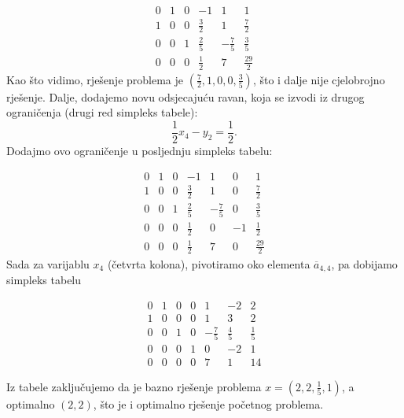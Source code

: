 \documentclass[a4paper, utf8, 11pt, colorlinks]{book}
\begin{document}
$$
\begin{array}{ccccc|c}
    0    &  1  &   0 &   -1  &            1 & 1                  \\
    1    &  0  &  0 &    \frac{3}{2}  &  1 & \frac{7}{2}\\ 
    0    &  0  &  1  &   \frac{2}{5}    &  -\frac{7}{5} & \frac{3}{5}  \\
     \hline 
    0    &  0  &  0   &    \frac{1}{2}  &  7  &    \frac{29}{2}
\end{array}
$$
Kao što vidimo, rješenje problema je $(\frac{7}{2}, 1, 0, 0, \frac{3}{5})$, što i dalje nije cjelobrojno rješenje. Dalje, dodajemo novu odsjecajuću ravan, koja se izvodi iz drugog ograničenja (drugi red simpleks tabele): 
$$ \frac{1}{2} x_4 - y_2 = \frac{1}{2}.$$
Dodajmo ovo ograničenje u posljednju simpleks tabelu:

$$
\begin{array}{cccccc|c}
    0    &  1  &   0 &   -1  &            1 & 0 & 1                  \\
    1    &  0  &  0 &    \frac{3}{2}    &  1 & 0 &  \frac{7}{2}\\ 
    0    &  0  &  1  &   \frac{2}{5}    &  -\frac{7}{5} &  0 & \frac{3}{5}  \\
    0    & 0   &  0  &   \frac{1}{2}    & 0     & -1 & \frac{1}{2} \\
     \hline 
    0    &  0  &  0   &    \frac{1}{2}  &  7  &   0 &  \frac{29}{2}
\end{array}
$$
Sada za varijablu $x_4$ (četvrta kolona), pivotiramo oko elementa $\overline{a}_{4,4}$, pa dobijamo simpleks tabelu 

$$
\begin{array}{cccccc|c}
0 &  1   &  0  &  0  &    1             &    -2           &   2         \\
1 &  0   &  0  &  0  &    1             &     3           &   2         \\
0 &  0   &  1  &  0  &   -\frac{7}{5}   &     \frac{4}{5} &   \frac{1}{5}\\
0 &  0   &  0  &  1  &   0              &    -2           &   1   \\ \hline
0 &  0   &  0  &  0  &   7              &     1           &   14
\end{array}
$$


Iz tabele zaključujemo da je bazno rješenje problema 
$x=(2,2, \frac{1}{5}, 1)$, a optimalno $(2, 2)$, što je i optimalno rješenje početnog problema. 
\end{document}
